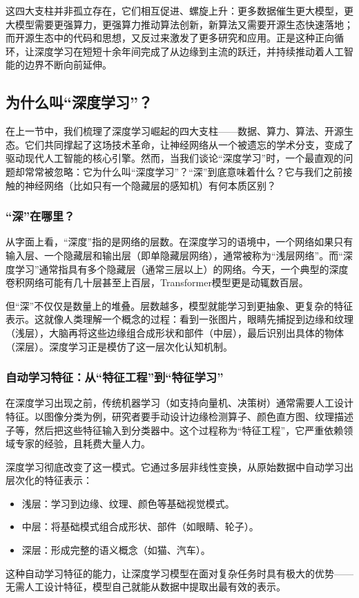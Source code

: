 \documentclass[lang=cn,zihao=-4,a4paper,fontset=windows]{beautybook}
\begin{document}
这四大支柱并非孤立存在，它们相互促进、螺旋上升：更多数据催生更大模型，更大模型需要更强算力，更强算力推动算法创新，新算法又需要开源生态快速落地；而开源生态中的代码和思想，又反过来激发了更多研究和应用。正是这种正向循环，让深度学习在短短十余年间完成了从边缘到主流的跃迁，并持续推动着人工智能的边界不断向前延伸。

\subsection{为什么叫“深度学习”？}

在上一节中，我们梳理了深度学习崛起的四大支柱——数据、算力、算法、开源生态。它们共同撑起了这场技术革命，让神经网络从一个被遗忘的学术分支，变成了驱动现代人工智能的核心引擎。然而，当我们谈论“深度学习”时，一个最直观的问题却常常被忽略：它为什么叫“深度学习”？“深”到底意味着什么？它与我们之前接触的神经网络（比如只有一个隐藏层的感知机）有何本质区别？

\subsubsection*{“深”在哪里？}

从字面上看，“深度”指的是网络的层数。在深度学习的语境中，一个网络如果只有输入层、一个隐藏层和输出层（即单隐藏层网络），通常被称为“浅层网络”。而“深度学习”通常指具有多个隐藏层（通常三层以上）的网络。今天，一个典型的深度卷积网络可能有几十层甚至上百层，Transformer模型更是动辄数百层。

但“深”不仅仅是数量上的堆叠。层数越多，模型就能学习到更抽象、更复杂的特征表示。这就像人类理解一个概念的过程：看到一张图片，眼睛先捕捉到边缘和纹理（浅层），大脑再将这些边缘组合成形状和部件（中层），最后识别出具体的物体（深层）。深度学习正是模仿了这一层次化认知机制。

\subsubsection*{自动学习特征：从“特征工程”到“特征学习”}

在深度学习出现之前，传统机器学习（如支持向量机、决策树）通常需要人工设计特征。以图像分类为例，研究者要手动设计边缘检测算子、颜色直方图、纹理描述子等，然后把这些特征输入到分类器中。这个过程称为“特征工程”，它严重依赖领域专家的经验，且耗费大量人力。

深度学习彻底改变了这一模式。它通过多层非线性变换，从原始数据中自动学习出层次化的特征表示：
\begin{itemize}
\item 浅层：学习到边缘、纹理、颜色等基础视觉模式。
\item 中层：将基础模式组合成形状、部件（如眼睛、轮子）。
\item 深层：形成完整的语义概念（如猫、汽车）。
\end{itemize}
这种自动学习特征的能力，让深度学习模型在面对复杂任务时具有极大的优势——无需人工设计特征，模型自己就能从数据中提取出最有效的表示。
\end{document}
